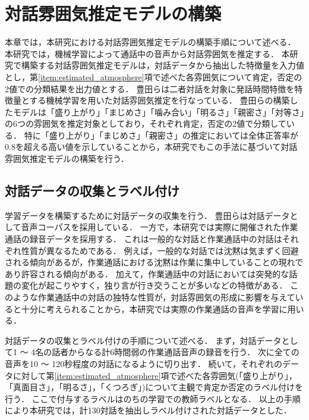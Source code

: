\chapter{対話雰囲気推定モデルの構築\label{sec:develop_estimation_model}}
\thispagestyle{plain}

本章では，本研究における対話雰囲気推定モデルの構築手順について述べる．
本研究では，機械学習によって通話中の音声から対話雰囲気を推定する．
本研究で構築する対話雰囲気推定モデルは，対話データから抽出した特徴量を入力値とし，第\ref{item:estimated_atmosphere}項で述べた各雰囲気について肯定，否定の2値での分類結果を出力値とする．
豊田らは二者対話を対象に発話時間特徴を特徴量とする機械学習を用いた対話雰囲気推定を行なっている\cite{Toyota}．
豊田らの構築したモデルは「盛り上がり」「まじめさ」「噛み合い」「明るさ」「親密さ」「対等さ」の6つの雰囲気を推定対象としており，それぞれ肯定，否定の2値で分類している．
特に「盛り上がり」「まじめさ」「親密さ」の推定においては全体正答率が0.8を超える高い値を示していることから，本研究でもこの手法に基づいて対話雰囲気推定モデルの構築を行う．

\section{対話データの収集とラベル付け\label{node:deta_collection}}

学習データを構築するために対話データの収集を行う．
豊田らは対話データとして音声コーパス\cite{PASD}を採用している．
一方で，本研究では実際に開催された作業通話の録音データを採用する．
これは一般的な対話と作業通話中の対話はそれぞれ性質が異なるためである．
例えば，一般的な対話では沈黙は気まずく回避される傾向があるが，作業通話における沈黙は作業に集中していることの現れであり許容される傾向がある．
加えて，作業通話中の対話においては突発的な話題の変化が起こりやすく，独り言が行き交うことが多いなどの特徴がある．
このような作業通話中の対話の独特な性質が，対話雰囲気の形成に影響を与えていると十分に考えられることから，本研究では実際の作業通話の音声を学習に用いる．

対話データの収集とラベル付けの手順について述べる．
まず，対話データとして1 〜 4名の話者からなる計6時間弱の作業通話音声の録音を行う．
次に全ての音声を10 〜 120秒程度の対話になるように切り出す．
続いて，それぞれのデータに対して第\ref{item:estimated_atmosphere}項で述べた各雰囲気(「盛り上がり」，「真面目さ」，「明るさ」，「くつろぎ」)について主観で肯定か否定のラベル付けを行う．
ここで付与するラベルはのちの学習での教師ラベルとなる．
以上の手順により本研究では，計130対話を抽出しラベル付けされた対話データとした．

